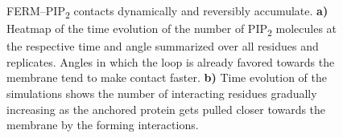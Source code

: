 \documentclass[
  twocolumn]{biophys-new-mod}
\begin{document}
\begin{figure}
\begin{minipage}[t]{\linewidth}
{{}

}

\subcaption{\label{fig-f0f1-retention}~}
\end{minipage}%

\caption{\label{fig-loop-importance-2}FERM--PIP\textsubscript{2}
contacts dynamically and reversibly accumulate. \textbf{a)} Heatmap of
the time evolution of the number of PIP\textsubscript{2} molecules at
the respective time and angle summarized over all residues and
replicates. Angles in which the loop is already favored towards the
membrane tend to make contact faster. \textbf{b)} Time evolution of the
simulations shows the number of interacting residues gradually
increasing as the anchored protein gets pulled closer towards the
membrane by the forming interactions.}

\end{figure}
\end{document}
